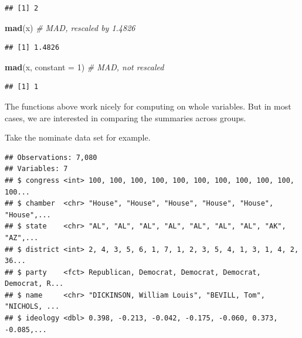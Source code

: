 \documentclass[]{book}
\newenvironment{Shaded}{\begin{snugshade}}{\end{snugshade}}
\newcommand{\CommentTok}[1]{\textcolor[rgb]{0.56,0.35,0.01}{\textit{#1}}}
\newcommand{\DataTypeTok}[1]{\textcolor[rgb]{0.13,0.29,0.53}{#1}}
\newcommand{\DecValTok}[1]{\textcolor[rgb]{0.00,0.00,0.81}{#1}}
\newcommand{\KeywordTok}[1]{\textcolor[rgb]{0.13,0.29,0.53}{\textbf{#1}}}
\newcommand{\NormalTok}[1]{#1}
\newcommand{\OperatorTok}[1]{\textcolor[rgb]{0.81,0.36,0.00}{\textbf{#1}}}
\newcommand{\StringTok}[1]{\textcolor[rgb]{0.31,0.60,0.02}{#1}}
\begin{document}
\begin{verbatim}
## [1] 2
\end{verbatim}

\begin{Shaded}
\begin{Highlighting}[]
\KeywordTok{mad}\NormalTok{(x)  }\CommentTok{# MAD, rescaled by 1.4826}
\end{Highlighting}
\end{Shaded}

\begin{verbatim}
## [1] 1.4826
\end{verbatim}

\begin{Shaded}
\begin{Highlighting}[]
\KeywordTok{mad}\NormalTok{(x, }\DataTypeTok{constant =} \DecValTok{1}\NormalTok{)  }\CommentTok{# MAD, not rescaled}
\end{Highlighting}
\end{Shaded}

\begin{verbatim}
## [1] 1
\end{verbatim}

The functions above work nicely for computing on whole variables. But in most cases, we are interested in comparing the summaries across groups.

Take the nominate data set for example.

\begin{Shaded}
\end{Shaded}

\begin{verbatim}
## Observations: 7,080
## Variables: 7
## $ congress <int> 100, 100, 100, 100, 100, 100, 100, 100, 100, 100, 100...
## $ chamber  <chr> "House", "House", "House", "House", "House", "House",...
## $ state    <chr> "AL", "AL", "AL", "AL", "AL", "AL", "AL", "AK", "AZ",...
## $ district <int> 2, 4, 3, 5, 6, 1, 7, 1, 2, 3, 5, 4, 1, 3, 1, 4, 2, 36...
## $ party    <fct> Republican, Democrat, Democrat, Democrat, Democrat, R...
## $ name     <chr> "DICKINSON, William Louis", "BEVILL, Tom", "NICHOLS, ...
## $ ideology <dbl> 0.398, -0.213, -0.042, -0.175, -0.060, 0.373, -0.085,...
\end{verbatim}
\end{document}
